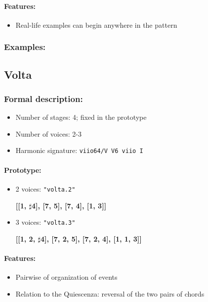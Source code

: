 ﻿\documentclass[11pt, openany]{article}
\begin{document}
\begin{itemize}
\paragraph{Features:}
\begin{itemize}
\item Real-life examples can begin anywhere in the pattern
\end{itemize}

\subsubsection{Examples:}


	\subsection{Volta}
	
\subsubsection{Formal description:}
\begin{itemize}
\item Number of stages: 4; fixed in the prototype
\item Number of voices: 2-3
\item Harmonic signature: \texttt{viio64/V V6 viio I}
\end{itemize}

\paragraph{Prototype:}
\begin{itemize}
\item 2 voices: \texttt{"volta.2"}
	\begin{center}
	\textbf{[[1, $\sharp$4], [7, 5], [7, 4], [1, 3]]}
	\end{center}
\item 3 voices: \texttt{"volta.3"}
	\begin{center}
	\textbf{[[1, 2, $\sharp$4], [7, 2, 5], [7, 2, 4], [1, 1, 3]]}
	\end{center}
\end{itemize}

\paragraph{Features:}
\begin{itemize}
\item Pairwise of organization of events
\item Relation to the Quiescenza: reversal of the two pairs of chords
\end{itemize}


\end{itemize}
\end{document}
